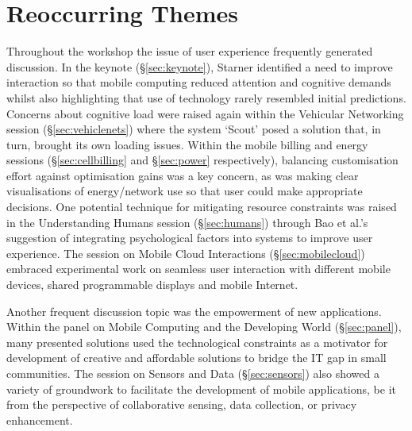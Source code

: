 \section{Reoccurring Themes}
\label{sec:keythemes}

Throughout the workshop the issue of user experience frequently generated 
discussion. In the keynote (\S\ref{sec:keynote}), Starner identified a need 
to improve interaction so that mobile computing reduced attention and cognitive 
demands whilst also highlighting that use of technology rarely resembled initial 
predictions. Concerns about cognitive load were raised again within the Vehicular 
Networking session (\S\ref{sec:vehiclenets}) where the system `Scout' posed 
a solution that, in turn, brought its own loading issues. Within the mobile 
billing and energy sessions (\S\ref{sec:cellbilling} and \S\ref{sec:power} 
respectively), balancing customisation effort against optimisation gains was a 
key concern, as was making clear visualisations of energy\slash network
use so that user could make appropriate decisions. One potential technique for 
mitigating resource constraints was raised in the Understanding Humans session 
(\S\ref{sec:humans}) through Bao et al.'s suggestion of integrating
psychological factors into systems to improve user experience. The
session on Mobile Cloud Interactions (\S\ref{sec:mobilecloud}) embraced
experimental work on seamless user interaction with different mobile
devices, shared programmable displays and mobile Internet.

Another frequent discussion topic was the empowerment of new
applications. Within the panel on Mobile Computing and the Developing
World (\S\ref{sec:panel}), many presented solutions used the
technological constraints as a motivator for development of creative and
affordable solutions to bridge the IT gap in small communities. The
session on Sensors and Data (\S\ref{sec:sensors}) also showed a variety
of groundwork to facilitate the development of mobile applications,
be it from the perspective of collaborative sensing, data collection,
or privacy enhancement.

